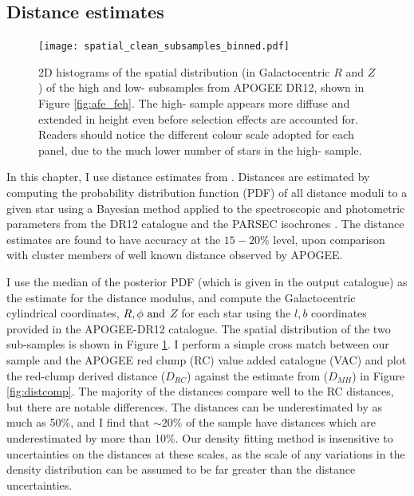  \subsection{Distance estimates}
 \label{sec:distances}
 
  \begin{figure}
 \centering
 	\texttt{[image: spatial\_clean\_subsamples\_binned.pdf]}
     \caption[The Galactocentric $R$ and $z$ distribution of stars in the APOGEE DR12 high and low-\afe{} populations]{2D histograms of the spatial distribution (in Galactocentric $R$ and $Z$) of the high and low-\afe{} subsamples from APOGEE DR12, shown in Figure \ref{fig:afe_feh}. The high-\afe{} sample appears more diffuse and extended in height even before selection effects are accounted for. Readers should notice the different colour scale adopted for each panel, due to the much lower number of stars in the high-\afe{} sample.}
     \label{fig:spatial}
 \end{figure}
In this chapter, I use distance estimates from \citet{2014AJ....147..116H} \citep[But see also][for further description]{2015ApJ...808..132H}. Distances are estimated by computing the probability distribution function (PDF) of all distance moduli to a given star using a Bayesian method applied to the spectroscopic and photometric parameters from the DR12 catalogue and the PARSEC isochrones \citep{2012MNRAS.427..127B}. The distance estimates are found to have accuracy at the $15-20\%$ level, upon comparison with cluster members of well known distance observed by APOGEE. 

I use the median of the posterior PDF (which is given in the output catalogue) as the estimate for the distance modulus, and compute the Galactocentric cylindrical coordinates, $R, \phi\ \rm{and}$  $Z$ for each star using the $l,b$ coordinates provided in the APOGEE-DR12 catalogue. The spatial distribution of the two \afe{} sub-samples is shown in Figure \ref{fig:spatial}. I perform a simple cross match between our sample and the APOGEE red clump (RC) value added catalogue (VAC) \citep{2014ApJ...790..127B} and plot the red-clump derived distance ($D_{RC}$) against the estimate from \citet{2014AJ....147..116H} ($D_{MH}$) in Figure \ref{fig:distcomp}. The majority of the \citet{2014AJ....147..116H} distances compare well to the RC distances, but there are notable differences. The \citet{2014AJ....147..116H} distances can be underestimated by as much as 50\%, and I find that $\sim20\%$ of the sample have distances which are underestimated by more than 10\%. Our density fitting method is insensitive to uncertainties on the distances at these scales, as the scale of any variations in the density distribution can be assumed to be far greater than the distance uncertainties. 

